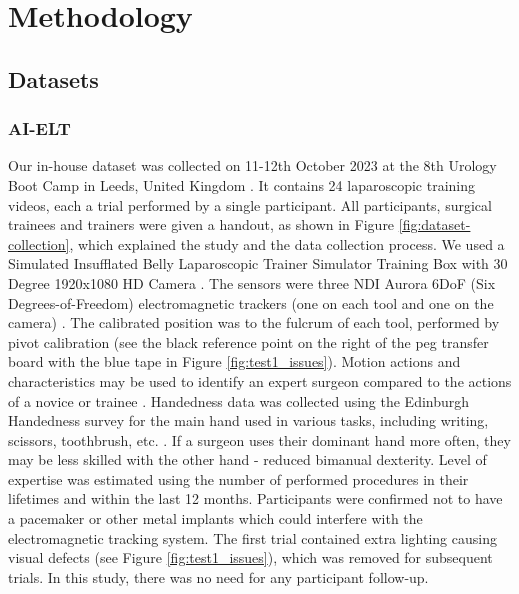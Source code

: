 \section{Methodology}

\subsection{Datasets}

\subsubsection{AI-ELT}

Our in-house dataset was collected on 11-12th October 2023 at the 8th Urology Boot Camp in Leeds, United Kingdom \cite{urology2023}. It contains 24 laparoscopic training videos, each a trial performed by a single participant. All participants, surgical trainees and trainers were given a handout, as shown in Figure \ref{fig:dataset-collection}, which explained the study and the data collection process. We used a Simulated Insufflated Belly Laparoscopic Trainer Simulator Training Box with 30 Degree 1920x1080 HD Camera \cite{aliexpress}. The sensors were three NDI Aurora 6DoF (Six Degrees-of-Freedom) electromagnetic trackers (one on each tool and one on the camera) \cite{hummel_design_2005}. The calibrated position was to the fulcrum of each tool, performed by pivot calibration (see the black reference point on the right of the peg transfer board with the blue tape in Figure \ref{fig:test1_issues}). Motion actions and characteristics may be used to identify an expert surgeon compared to the actions of a novice or trainee \cite{jones_analysis_2018}. Handedness data was collected using the Edinburgh Handedness survey for the main hand used in various tasks, including writing, scissors, toothbrush, etc. \cite{oldfield_assessment_1971}. If a surgeon uses their dominant hand more often, they may be less skilled with the other hand - reduced bimanual dexterity. Level of expertise was estimated using the number of performed procedures in their lifetimes and within the last 12 months. Participants were confirmed not to have a pacemaker or other metal implants which could interfere with the electromagnetic tracking system. The first trial contained extra lighting causing visual defects (see Figure \ref{fig:test1_issues}), which was removed for subsequent trials. In this study, there was no need for any participant follow-up.

